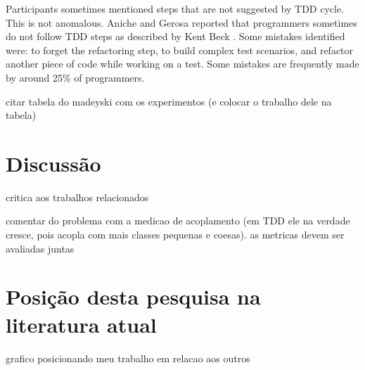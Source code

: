Participants sometimes mentioned steps that are not suggested by TDD cycle. This
is not anomalous. Aniche and Gerosa \cite{aniche-gerosa} reported that
programmers sometimes do not follow TDD steps as described by Kent Beck \cite{tdd-by-example}.
Some mistakes identified were: to forget the refactoring step, to build complex
test scenarios, and refactor another piece of code while working on a test.
Some mistakes are frequently made by around 25\% of programmers.

citar tabela do madeyski com os experimentos (e colocar o trabalho dele na
tabela)

\section{Discussão}
critica aos trabalhos relacionados

comentar do problema com a medicao de acoplamento (em TDD ele na verdade cresce, pois acopla com mais classes pequenas e coesas).
as metricas devem ser avaliadas juntas

\section{Posição desta pesquisa na literatura atual}

grafico posicionando meu trabalho em relacao aos outros
